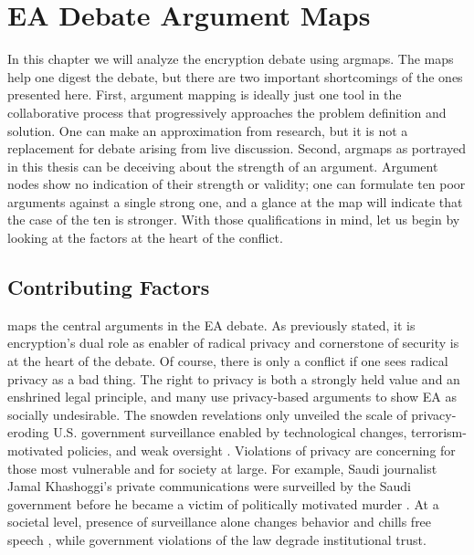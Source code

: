 \chapter{EA Debate Argument Maps}
\label{chap-arguments}

In this chapter we will analyze the \ac{encryption} debate using \acp{argmap}. The maps help one digest the debate, but
there are two important shortcomings of the ones presented here. First, argument mapping is ideally just one tool in the
collaborative process that progressively approaches the problem definition and solution. One can make an approximation
from research, but it is not a replacement for debate arising from live discussion. Second, \acp{argmap} as portrayed in
this thesis can be deceiving about the strength of an argument. Argument nodes show no indication of their strength or
validity; one can formulate ten poor arguments against a single strong one, and a glance at the map will indicate that
the case of the ten is stronger. With those qualifications in mind, let us begin by looking at the factors at the heart
of the conflict.


\section{Contributing Factors}
\label{sed-arg-contrib}

 maps the central arguments in the EA debate. As previously stated, it is \ac{encryption}'s dual
role as enabler of radical privacy and cornerstone of security is at the heart of the debate. Of course, there is only a
conflict if one sees radical privacy as a bad thing. The right to privacy is both a strongly held value and an enshrined
legal principle, and many use privacy-based arguments to show \ac{EA} as socially undesirable. The \ac{snowden}
revelations \cite{landau_making_2013} only unveiled the scale of privacy-eroding U.S. government surveillance enabled by
technological changes, terrorism-motivated policies, and weak oversight \cite{shamsi_2011}. Violations of privacy are
concerning for those most vulnerable and for society at large. For example, Saudi journalist Jamal Khashoggi's private
communications were surveilled by the Saudi government before he became a victim of politically motivated murder
\cite{liebermann_2019}. At a societal level, presence of surveillance alone changes behavior and chills free speech
\cite{rogaway_moral_2015}, while government violations of the law degrade institutional trust.

